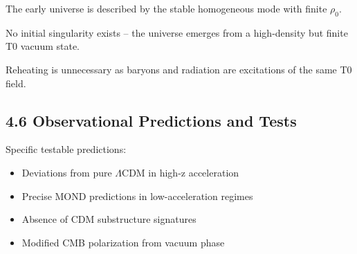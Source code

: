 	The early universe is described by the stable homogeneous mode with finite $\rho_0$.
	
	No initial singularity exists – the universe emerges from a high-density but finite T0 vacuum state.
	
	Reheating is unnecessary as baryons and radiation are excitations of the same T0 field.
	
	\subsection{4.6 Observational Predictions and Tests}
	
	\begin{table}[htbp]
		\centering        {}
		\caption{Cosmological predictions comparison}
		\label{tab:cosmo}
	\end{table}
	
	Specific testable predictions:
	\begin{itemize}
		\item Deviations from pure $\Lambda$CDM in high-z acceleration
		\item Precise MOND predictions in low-acceleration regimes
		\item Absence of CDM substructure signatures
		\item Modified CMB polarization from vacuum phase
	\end{itemize}
	

